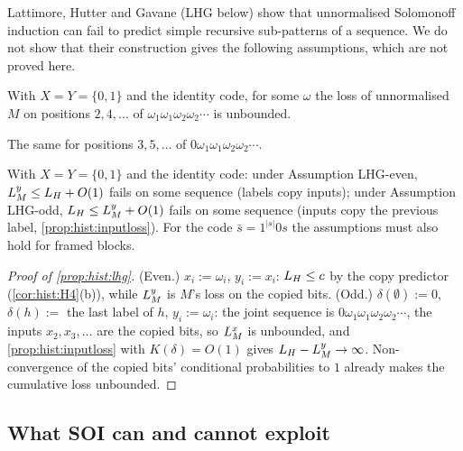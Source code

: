 Lattimore, Hutter and Gavane (LHG below) \citep{lattimore2011universal} show that unnormalised Solomonoff induction can fail to predict simple recursive sub-patterns of a sequence. We do not show that their construction gives the following assumptions, which are not proved here.

\begin{assumption}\label{ass:hist:lhgeven}
With $X=Y=\{0,1\}$ and the identity code, for some $\omega$ the loss of unnormalised $M$ on positions $2,4,\dots$ of $\omega_1\omega_1\omega_2\omega_2\cdots$ is unbounded.
\end{assumption}

\begin{assumption}\label{ass:hist:lhgodd}
The same for positions $3,5,\dots$ of $0\omega_1\omega_1\omega_2\omega_2\cdots$.
\end{assumption}

\begin{proposition}\label{prop:hist:lhg}
With $X=Y=\{0,1\}$ and the identity code: under Assumption LHG-even, $L_{M}^{y}\le L_{H}+O(1)$ fails on some sequence (labels copy inputs); under Assumption LHG-odd, $L_{H}\le L_{M}^{y}+O(1)$ fails on some sequence (inputs copy the previous label, \cref{prop:hist:inputloss}). For the code $\bar s=1^{|s|}0s$ the assumptions must also hold for framed blocks.
\end{proposition}

\begin{proof}[Proof of \cref{prop:hist:lhg}]
(Even.) $x_i:=\omega_i$, $y_i:=x_i$: $L_{H}\le c$ by the copy predictor (\cref{cor:hist:H4}(b)), while $L_{M}^{y}$ is $M$'s loss on the copied bits. (Odd.) $\delta(\emptyset):=0$, $\delta(h):=$ the last label of $h$, $y_i:=\omega_i$: the joint sequence is $0\omega_1\omega_1\omega_2\omega_2\cdots$, the inputs $x_2,x_3,\dots$ are the copied bits, so $L_{M}^{x}$ is unbounded, and \cref{prop:hist:inputloss} with $K(\delta)=O(1)$ gives $L_{H}-L_{M}^{y}\to\infty$. Non-convergence of the copied bits' conditional probabilities to $1$ already makes the cumulative loss unbounded.
\end{proof}

\subsection{What SOI can and cannot exploit}\label{app:hist:exploit}

